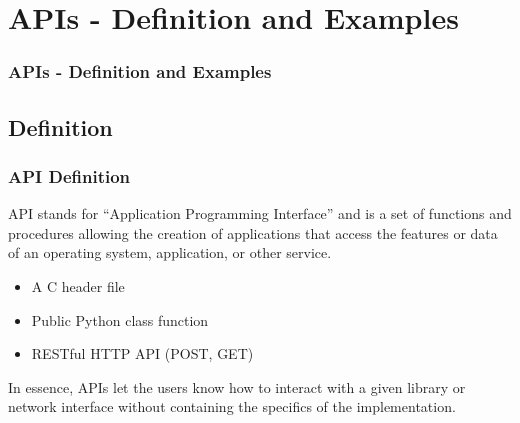 \documentclass[t]{beamer}
\begin{document}
\section{APIs - Definition and Examples}

\begin{frame}
  \frametitle{APIs - Definition and Examples}
  \tableofcontents[currentsection]
  \vspace{200pt}  %
\end{frame}

\subsection{Definition}
\begin{frame}
  \frametitle{API Definition}

  API stands for ``Application Programming Interface'' and is a set of
  functions and procedures allowing the creation of applications that access
  the features or data of an operating system, application, or other service.


  \begin{examples}
    \begin{itemize}
    \item A C header file
    \item Public Python class function
    \item RESTful HTTP API (POST, GET)
    \end{itemize}
  \end{examples}

  In essence, APIs let the users know how to interact with a given library or
  network interface without containing the specifics of the implementation.


\end{frame}
\end{document}
